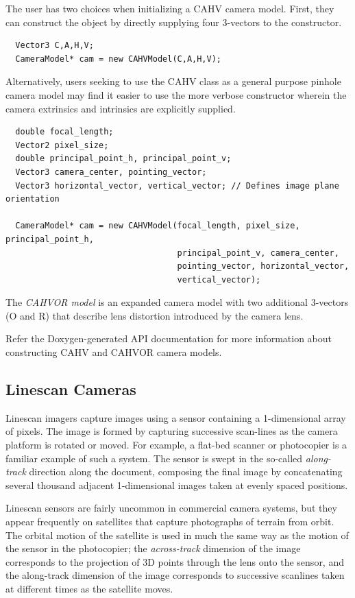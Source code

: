 The user has two choices when initializing a CAHV camera model.
First, they can construct the object by directly supplying four
3-vectors to the constructor.

\begin{verbatim}
  Vector3 C,A,H,V;
  CameraModel* cam = new CAHVModel(C,A,H,V);
\end{verbatim}

Alternatively, users seeking to use the CAHV class as a general purpose pinhole
camera model may find it easier to use the more verbose constructor
wherein the camera extrinsics and intrinsics are explicitly supplied.

\begin{verbatim}
  double focal_length;
  Vector2 pixel_size;
  double principal_point_h, principal_point_v;
  Vector3 camera_center, pointing_vector;
  Vector3 horizontal_vector, vertical_vector; // Defines image plane orientation

  CameraModel* cam = new CAHVModel(focal_length, pixel_size, principal_point_h, 
                                   principal_point_v, camera_center, 
                                   pointing_vector, horizontal_vector,
                                   vertical_vector);  
\end{verbatim}


The {\em CAHVOR model} is an expanded camera model with two additional
3-vectors (O and R) that describe lens distortion introduced by the
camera lens.

Refer the Doxygen-generated API documentation for more information
about constructing CAHV and CAHVOR camera models.

\subsection{Linescan Cameras}

Linescan imagers capture images using a sensor containing a
1-dimensional array of pixels.  The image is formed by capturing
successive scan-lines as the camera platform is rotated or moved.  For
example, a flat-bed scanner or photocopier is a familiar example of
such a system.  The sensor is swept in the so-called {\em along-track}
direction along the document, composing the final image by
concatenating several thousand adjacent 1-dimensional images taken at
evenly spaced positions.

Linescan sensors are fairly uncommon in commercial camera systems, but
they appear frequently on satellites that capture photographs of
terrain from orbit.  The orbital motion of the satellite is used in
much the same way as the motion of the sensor in the photocopier; the
{\em across-track} dimension of the image corresponds to the
projection of 3D points through the lens onto the sensor, and the
along-track dimension of the image corresponds to successive scanlines
taken at different times as the satellite moves.

